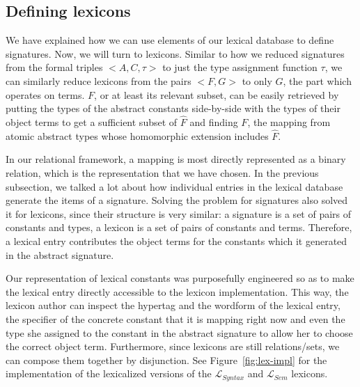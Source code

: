 \subsection{Defining lexicons}

We have explained how we can use elements of our lexical database to
define signatures. Now, we will turn to lexicons. Similar to how we
reduced signatures from the formal triples $\mathopen{<}A, C,
\tau\mathclose{>}$ to just the type assignment function $\tau$, we can
similarly reduce lexicons from the pairs $\mathopen{<}F, G\mathclose{>}$
to only $G$, the part which operates on terms. $F$, or at least its
relevant subset, can be easily retrieved by putting the types of the
abstract constants side-by-side with the types of their object terms to
get a sufficient subset of $\hat{F}$ and finding $F$, the mapping from
atomic abstract types whose homomorphic extension includes $\hat{F}$.

In our relational framework, a mapping is most directly represented as a
binary relation, which is the representation that we have chosen. In the
previous subsection, we talked a lot about how individual entries in
the lexical database generate the items of a signature. Solving the
problem for signatures also solved it for lexicons, since their
structure is very similar: a signature is a set of pairs of constants
and types, a lexicon is a set of pairs of constants and
terms. Therefore, a lexical entry contributes the object terms for the
constants which it generated in the abstract signature.

Our representation of lexical constants was purposefully engineered so
as to make the lexical entry directly accessible to the lexicon
implementation. This way, the lexicon author can inspect the hypertag
and the wordform of the lexical entry, the specifier of the concrete
constant that it is mapping right now and even the type she assigned to
the constant in the abstract signature to allow her to choose the
correct object term. Furthermore, since lexicons are still
relations/sets, we can compose them together by disjunction. See
Figure~\ref{fig:lex-impl} for the implementation of the lexicalized
versions of the $\mathcal{L}_{Syntax}$ and $\mathcal{L}_{Sem}$ lexicons.

